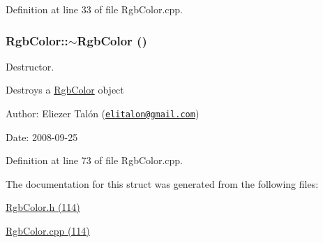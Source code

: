 Definition at line 33 of file RgbColor.cpp.\hypertarget{struct_rgb_color_1d4e0b01edaea01389a3fd3e02ed9f74}{
\subsubsection[$\sim$RgbColor]{\setlength{\rightskip}{0pt plus 5cm}RgbColor::$\sim$RgbColor ()}}
\label{struct_rgb_color_1d4e0b01edaea01389a3fd3e02ed9f74}


Destructor. 

Destroys a \hyperlink{struct_rgb_color}{RgbColor} object

\begin{Desc}
\item[Author:]Eliezer Talón (\href{mailto:elitalon@gmail.com}{\tt elitalon@gmail.com}) \end{Desc}
\begin{Desc}
\item[Date:]2008-09-25 \end{Desc}


Definition at line 73 of file RgbColor.cpp.

The documentation for this struct was generated from the following files:\begin{CompactItemize}
\item 
\hyperlink{_rgb_color_8h}{RgbColor.h (114)}\item 
\hyperlink{_rgb_color_8cpp}{RgbColor.cpp (114)}\end{CompactItemize}
